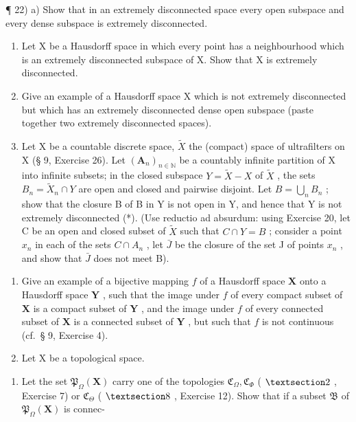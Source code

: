 ¶ 22) a) Show that in an extremely disconnected space every open subspace and every dense subspace is extremely disconnected.

\begin{enumerate}
\def\labelenumi{\alph{enumi})}
\setcounter{enumi}{1}
\item
  Let X be a Hausdorff space in which every point has a neighbourhood which is an extremely disconnected subspace of X. Show that X is extremely disconnected.
\item
  Give an example of a Hausdorff space X which is not extremely disconnected but which has an extremely disconnected dense open subspace (paste together two extremely disconnected spaces).
\item
  Let X be a countable discrete space, \(\tilde{X}\) the (compact) space of ultrafilters on X (§ 9, Exercise 26). Let \((\mathbf{A}_{n})_{n\in\mathbb{N}}\) be a countably infinite partition of X into infinite subsets; in the closed subspace \(Y=\tilde{X}-X\) of \(\tilde{X}\) , the sets \(B_{n}=\tilde{X}_{n}\cap Y\) are open and closed and pairwise disjoint. Let \(B=\bigcup_{n}B_{n}\) ; show that the closure B of B in Y is not open in Y, and hence that Y is not extremely disconnected (*). (Use reductio ad absurdum: using Exercise 20, let C be an open and closed subset of \(\tilde{X}\) such that \(C\cap Y=B\) ; consider a point \(x_{n}\) in each of the sets \(C\cap A_{n}\) , let \(\bar{J}\) be the closure of the set J of points \(x_{n}\) , and show that \(\bar{J}\) does not meet B).
\end{enumerate}

\begin{enumerate}
\def\labelenumi{\arabic{enumi})}
\setcounter{enumi}{22}
\item
  Give an example of a bijective mapping \(f\) of a Hausdorff space \(\mathbf{X}\) onto a Hausdorff space \(\mathbf{Y}\) , such that the image under \(f\) of every compact subset of \(\mathbf{X}\) is a compact subset of \(\mathbf{Y}\) , and the image under \(f\) of every connected subset of \(\mathbf{X}\) is a connected subset of \(\mathbf{Y}\) , but such that \(f\) is not continuous (cf.~§ 9, Exercise 4).
\item
  Let X be a topological space.
\end{enumerate}

\begin{enumerate}
\def\labelenumi{\alph{enumi})}
\tightlist
\item
  Let the set \(\mathfrak{P}_{\Omega}(\mathbf{X})\) carry one of the topologies \(\mathfrak{C}_{\Omega}, \mathfrak{C}_{\Phi}\) ( \(\S 2\) , Exercise 7) or \(\mathfrak{C}_{\Theta}\) ( \(\S 8\) , Exercise 12). Show that if a subset \(\mathfrak{B}\) of \(\mathfrak{P}_{\Omega}(\mathbf{X})\) is connec-
\end{enumerate}


